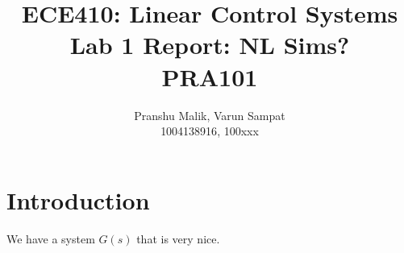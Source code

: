 \documentclass[10pt]{article}
\date{}
\begin{document}
\title{\textbf{\Large{\textsc{ECE410:} Linear Control Systems}} \\ \Large{Lab 1 Report: NL Sims?} \\ \textbf{\small{PRA101}}\vspace{-0.3cm}}
\author{Pranshu Malik, Varun Sampat \\ \footnotesize{1004138916}, \footnotesize{100xxx}\vspace{-3cm}}

\maketitle

\section{Introduction}
We have a system $G(s)$ that is very nice.
\end{document}
